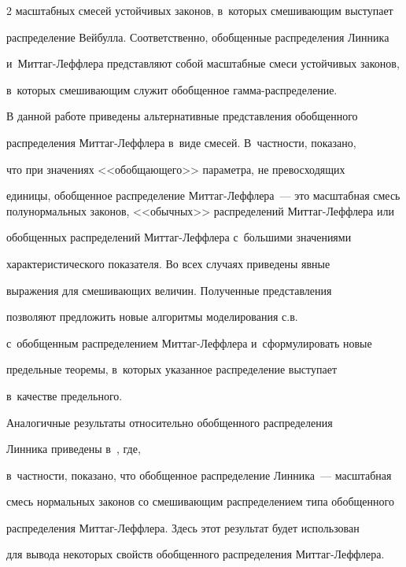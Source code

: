 \begin{multicols}{2}
масштабных смесей устойчивых законов, в~которых смешивающим выступает 


распределение Вейбулла. Соответственно, обоб\-щен\-ные распределения Линника 


и~Мит\-таг-Леф\-фле\-ра представляют собой масштабные смеси устойчивых законов, 


в~которых смешивающим служит обобщенное гам\-ма-рас\-пре\-де\-ление.





В данной работе приведены альтернативные представления обобщенного


распределения Мит\-таг-Леф\-фле\-ра в~виде смесей. В~частности, показано,


что при значениях <<обобщающего>> параметра, не превосходящих


единицы, обобщенное распределение Мит\-таг-Леф\-фле\-ра~--- это масштабная смесь полунормальных законов, <<обычных>> распределений Миттаг-Леффлера или


обобщенных распределений Мит\-таг-Леф\-фле\-ра с~б$\acute{\mbox{о}}$льшими значениями


характеристического показателя. Во всех случаях приведены явные


выражения для смешивающих величин. Полученные представления


позволяют предложить новые алгоритмы моделирования с.в.\


с~обобщенным распределением Мит\-таг-Леф\-фле\-ра и~сформулировать новые


предельные теоремы, в~которых указанное распределение выступает 


в~качестве предельного.





Аналогичные результаты относительно обобщенного распределения


Линника приведены в~\cite{KorolevGorsheninZeifman2018}, где,


в~частности, показано, что обобщенное распределение Линника~--- масштабная 


смесь нормальных законов со смешивающим распределением типа обобщенного 


распределения Мит\-таг-Леф\-фле\-ра. Здесь этот результат будет использован 


для вывода некоторых свойств обобщенного распределения Мит\-таг-Леф\-флера.






\end{multicols}
